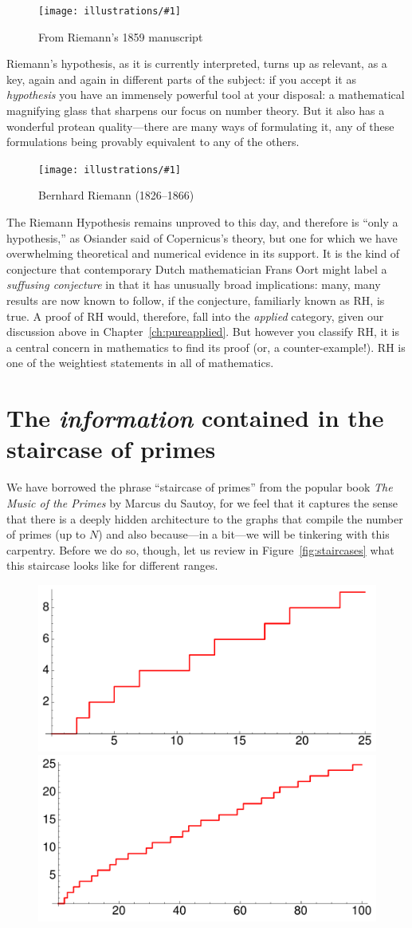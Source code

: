 \documentclass[openany]{book}
\newcommand{\ill}[3]{%
   \begin{figure}[H]%
   \vspace{-2ex}
   \centering%
   \texttt{[image: illustrations/\#1]}%
   \caption{#3}%
   \vspace{-2ex}
    \end{figure}}
\theoremstyle{plain}
\theoremstyle{definition}
\newcommand{\RH}{Riemann Hypothesis\index{Riemann Hypothesis}}
\begin{document}
{\ill{riemann_zoom}{1}{From Riemann's 1859 manuscript\label{fig:riemamn}}




Riemann's hypothesis, as it is currently interpreted, turns up as
relevant, as a key, again and again in different parts of the subject:
if you accept it as {\em hypothesis} you have an immensely powerful
tool at your disposal: a mathematical magnifying glass that sharpens
our focus on number theory. But it also has a wonderful protean
quality---there are many ways of formulating it, any of these
formulations being provably equivalent to any of the others.

\ill{riemann}{.3}{Bernhard Riemann (1826--1866)\index{Riemann, Bernhard}}


The \RH{} remains unproved to this day, and therefore is ``only a
hypothesis,'' as Osiander said of Copernicus's theory, but one for
which we have overwhelming theoretical and numerical evidence in its
support.  It is the kind of conjecture that contemporary Dutch
mathematician Frans Oort might label a {\em suffusing conjecture} in
that it has unusually broad implications: many, many results are now
known to follow, if the conjecture, familiarly known as RH, is true.
A proof of RH would, therefore, fall into the {\em applied} category,
given our discussion above in Chapter~\ref{ch:pureapplied}.  But
however you classify RH, it is a central concern in mathematics to
find its proof (or, a counter-example!).  RH is one of the weightiest
statements in all of mathematics.


\chapter[The staircase of primes]{The {\em information} contained in the staircase of primes\label{sec:information}}



We have borrowed the phrase ``staircase of primes'' from the popular
book {\em The Music of the Primes} by Marcus du Sautoy, for we feel that
it captures the sense that there is a deeply hidden architecture to
the graphs that compile the number of primes (up to $N$) and also
because---in a bit---we will be tinkering with this carpentry.  Before
we do so, though, let us review in Figure~\ref{fig:staircases}
what this staircase looks like for different ranges.

\begin{figure}[H]
\centering
\includegraphics[width=.4\textwidth]{illustrations/PN_25}
\includegraphics[width=.4\textwidth]{illustrations/PN_100}\\


\end{figure}}
\end{document}
